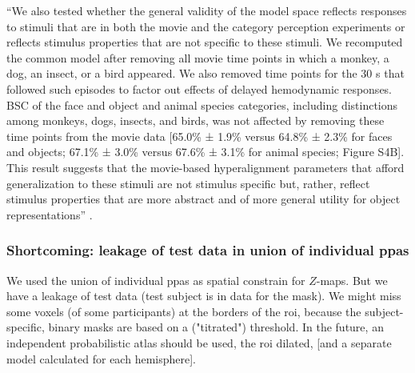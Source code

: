 %
``We also tested whether the general validity of the model space reflects
responses to stimuli that are in both the movie and the category perception
experiments or reflects stimulus properties that are not specific to these
stimuli.
%
We recomputed the common model after removing all movie time points in which a
monkey, a dog, an insect, or a bird appeared. We also removed time points for
the 30 s that followed such episodes to factor out effects of delayed
hemodynamic responses.
%
BSC of the face and object and animal species categories, including distinctions
among monkeys, dogs, insects, and birds, was not affected by removing these time
points from the movie data [65.0\% ± 1.9\% versus 64.8\% ± 2.3\% for faces and
objects; 67.1\% ± 3.0\% versus 67.6\% ± 3.1\% for animal species; Figure S4B].
%
This result suggests that the movie-based hyperalignment parameters that afford
generalization to these stimuli are not stimulus specific but, rather, reflect
stimulus properties that are more abstract and of more general utility for
object representations'' \citep{haxby2011common}.


\subsubsection{Shortcoming: leakage of test data in union of individual
\acp{ppa}}

%
We used the union of individual \acp{ppa} as spatial constrain for $Z$-maps.
%
But we have a leakage of test data (test subject is in data for the mask).
%
We might miss some voxels (of some participants) at the borders of the \ac{roi},
because the subject-specific, binary masks are based on a ("titrated")
threshold.  \citep{sengupta2016extension}
%
In the future, an independent probabilistic atlas should be used, the \ac{roi}
dilated, [and a separate model calculated for each hemisphere].
